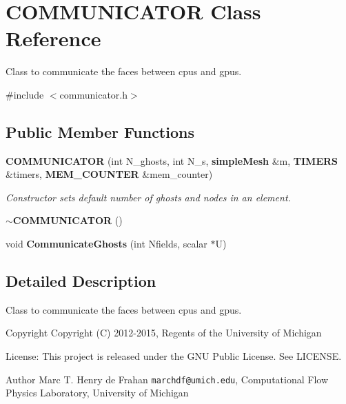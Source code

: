 \section{C\-O\-M\-M\-U\-N\-I\-C\-A\-T\-O\-R Class Reference}
\label{classCOMMUNICATOR}


Class to communicate the faces between cpus and gpus.  




{\ttfamily \#include $<$communicator.\-h$>$}

\subsection*{Public Member Functions}
\begin{DoxyCompactItemize}
\item 
{\bf C\-O\-M\-M\-U\-N\-I\-C\-A\-T\-O\-R} (int N\-\_\-ghosts, int N\-\_\-s, {\bf simple\-Mesh} \&m, {\bf T\-I\-M\-E\-R\-S} \&timers, {\bf M\-E\-M\-\_\-\-C\-O\-U\-N\-T\-E\-R} \&mem\-\_\-counter)
\begin{DoxyCompactList}\small\item\em Constructor sets default number of ghosts and nodes in an element. \end{DoxyCompactList}\item 
{\bf $\sim$\-C\-O\-M\-M\-U\-N\-I\-C\-A\-T\-O\-R} ()
\item 
void {\bf Communicate\-Ghosts} (int Nfields, scalar $\ast$U)
\end{DoxyCompactItemize}


\subsection{Detailed Description}
Class to communicate the faces between cpus and gpus. 

\begin{DoxyCopyright}{Copyright}
Copyright (C) 2012-\/2015, Regents of the University of Michigan 
\end{DoxyCopyright}
\begin{DoxyParagraph}{License\-:}
This project is released under the G\-N\-U Public License. See L\-I\-C\-E\-N\-S\-E. 
\end{DoxyParagraph}
\begin{DoxyAuthor}{Author}
Marc T. Henry de Frahan {\tt marchdf@umich.\-edu}, Computational Flow Physics Laboratory, University of Michigan 
\end{DoxyAuthor}
